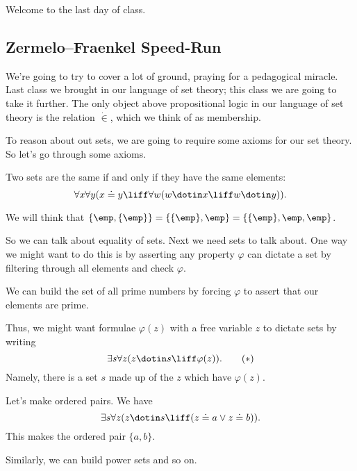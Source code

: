 
Welcome to the last day of class.

\subsection{Zermelo--Fraenkel Speed-Run}
We're going to try to cover a lot of ground, praying for a pedagogical miracle. Last class we brought in our language of set theory; this class we are going to take it further. The only object above propositional logic in our language of set theory is the relation $\dot\in$, which we think of as membership.

To reason about out sets, we are going to require some axioms for our set theory. So let's go through some axioms.
\begin{axiom}[Existentionality]
	Two sets are the same if and only if they have the same elements:
	\[\forall x\forall y(x\doteq y\liff\forall w(w\dotin x\liff w\dotin y)).\]
\end{axiom}
\begin{example}
	We will think that $\{\emp,\{\emp\}\}=\{\{\emp\},\emp\}=\{\{\emp\},\emp,\emp\}$.
\end{example}
So we can talk about equality of sets. Next we need sets to talk about. One way we might want to do this is by asserting any property $\varphi$ can dictate a set by filtering through all elements and check $\varphi$.
\begin{example}
	We can build the set of all prime numbers by forcing $\varphi$ to assert that our elements are prime.
\end{example}
Thus, we might want formulae $\varphi(z)$ with a free variable $z$ to dictate sets by writing
\[\exists s\forall z(z\dotin s\liff\varphi(z)).\tag{$*$}\label{eq:comprehension}\]
Namely, there is a set $s$ made up of the $z$ which have $\varphi(z)$.
\begin{example}
	Let's make ordered pairs. We have
	\[\exists s\forall z(z\dotin s\liff(z\doteq a\lor z\doteq b)).\]
	This makes the ordered pair $\{a,b\}$.
\end{example}
Similarly, we can build power sets and so on.

